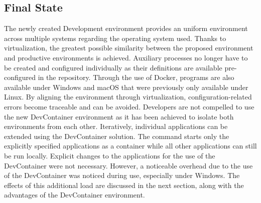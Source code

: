         \subsection{Final State}\label{sec::final}
        The newly created Development environment provides an uniform environment across multiple systems regarding the operating system used. Thanks to virtualization, the greatest possible similarity between the proposed environment and productive environments is achieved. Auxiliary processes no longer have to be created and configured individually as their definitions are available pre-configured in the repository. Through the use of Docker, programs are also available under Windows and macOS that were previously only available under Linux. By aligning the environment through virtualization, configuration-related errors become traceable and can be avoided. \newline
        Developers are not compelled to use the new DevContainer environment as it has been achieved to isolate both environments from each other. Iteratively, individual applications can be extended using the DevContainer solution. The command  starts only the explicitly specified applications as a container while all other applications can still be run locally. Explicit changes to the applications for the use of the DevContainer were not necessary.\newline
        However, a noticeable overhead due to the use of the DevContainer was noticed during use, especially under Windows.  The effects of this additional load are discussed in the next section, along with the advantages of the DevContainer environment.

